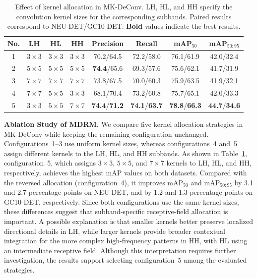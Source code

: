 \documentclass[pdflatex,sn-nature]{sn-jnl}
\begin{document}
\begin{table}[!t]
    \centering
    \caption{Effect of kernel allocation in MK-DeConv. LH, HL, and HH specify the convolution kernel sizes for the corresponding subbands. Paired results correspond to NEU-DET/GC10-DET. \textbf{Bold} values indicate the best results.}
    \label{tab:mdrm_kernel}
    \footnotesize
    \setlength{\tabcolsep}{3pt}
    \renewcommand{\arraystretch}{1.15}
    \begin{tabular*}{\textwidth}
    {@{\extracolsep{\fill}}cccccccc@{}}
    \toprule
    \textbf{No.} &
    \textbf{LH} &
    \textbf{HL} &
    \textbf{HH} &
    \textbf{Precision} &
    \textbf{Recall} &
    \textbf{mAP$_{50}$} &
    \textbf{mAP$_{50:95}$} \\
    \midrule
    1 & $3\times3$ & $3\times3$ & $3\times3$
    & 70.2/64.5
    & 72.2/58.0
    & 76.1/61.9
    & 42.0/32.4 \\

    2 & $5\times5$ & $5\times5$ & $5\times5$
    & \textbf{74.4}/65.6
    & 69.3/57.6
    & 75.6/62.1
    & 41.7/31.9 \\

    3 & $7\times7$ & $7\times7$ & $7\times7$
    & 73.8/67.5
    & 70.0/60.3
    & 75.9/63.5
    & 41.9/32.1 \\

    4 & $7\times7$ & $5\times5$ & $3\times3$
    & 68.1/70.4
    & 73.2/60.8
    & 75.7/65.1
    & 42.0/33.3 \\
    \midrule
    5 & $3\times3$ & $5\times5$ & $7\times7$
    & \textbf{74.4}/\textbf{71.2}
    & \textbf{74.1}/\textbf{63.7}
    & \textbf{78.8}/\textbf{66.3}
    & \textbf{44.7}/\textbf{34.6} \\
    \bottomrule
    \end{tabular*}
\end{table}

\noindent\textbf{Ablation Study of MDRM.} 
We compare five kernel allocation strategies in MK-DeConv while
keeping the remaining configuration unchanged. Configurations~1--3
use uniform kernel sizes, whereas configurations~4 and~5 assign
different kernels to the LH, HL, and HH subbands. As shown in
Table~\ref{tab:mdrm_kernel}, configuration~5, which assigns
$3\times3$, $5\times5$, and $7\times7$ kernels to LH, HL, and HH,
respectively, achieves the highest mAP values on both datasets.
Compared with the reversed allocation (configuration~4), it
improves $\mathrm{mAP}_{50}$ and $\mathrm{mAP}_{50:95}$ by
3.1 and 2.7 percentage points on NEU-DET, and by 1.2 and
1.3 percentage points on GC10-DET, respectively. Since both
configurations use the same kernel sizes, these differences
suggest that subband-specific receptive-field allocation is
important. A possible explanation is that smaller kernels
better preserve localized directional details in LH, while
larger kernels provide broader contextual integration for
the more complex high-frequency patterns in HH, with HL
using an intermediate receptive field. Although this
interpretation requires further investigation, the results
support selecting configuration~5 among the evaluated
strategies.
\end{document}
